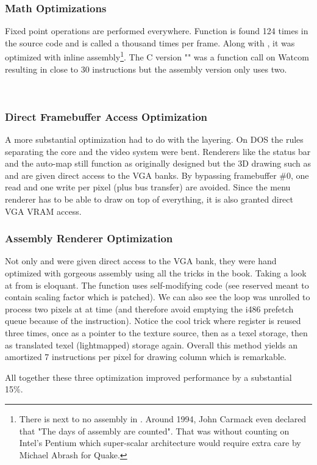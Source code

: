 \subsubsection{Math Optimizations}
Fixed point operations are performed everywhere. Function  is found 124 times in the source code and is called a thousand times per frame. Along with , it was optimized with inline assembly\footnote{There is next to no assembly in \doom. Around 1994, John Carmack even declared that "The days of assembly are counted". That was without counting on Intel's Pentium which super-scalar architecture would require extra care by Michael Abrash for Quake.}. The C version "" was a function call on Watcom resulting in close to 30 instructions but the assembly version only uses two.\\
\par
{}\\


\vspace{-2mm}
\subsubsection{Direct Framebuffer Access Optimization}
A more substantial optimization had to do with the layering. On DOS the rules separating the core and the video system were bent. Renderers like the status bar and the auto-map still function as originally designed but the 3D drawing such as  and  are given direct access to the VGA banks. By bypassing framebuffer \#0, one read and one write per pixel (plus bus transfer) are avoided. Since the menu renderer has to be able to draw on top of everything, it is also granted direct VGA VRAM access.\\



\subsubsection{Assembly Renderer Optimization}
Not only  and  were given direct access to the VGA bank, they were hand optimized with gorgeous assembly using all the tricks in the book. Taking a look at  from  is eloquant. The function uses self-modifying code (see reserved  meant to contain scaling factor which is patched). We can also see the loop was unrolled to process two pixels at at time (and therefore avoid emptying the i486 prefetch queue because of the  instruction). Notice the cool trick where register  is reused three times, once as a pointer to the texture source, then as a  texel storage, then as  translated texel (lightmapped) storage again. Overall this method yields an amortized 7 instructions per pixel for drawing column which is remarkable.\\
\par
All together these three optimization improved performance by a substantial 15\%.






